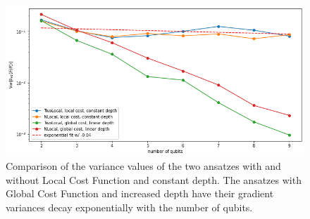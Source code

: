 \begin{figure}
    \includegraphics[width=\textwidth]{Artefact/Appendices/variancesLCF.png}
    \caption{
        Comparison of the variance values of the two ansatzes with and without Local Cost Function and constant depth.
        The ansatzes with Global Cost Function and increased depth have their gradient variances decay exponentially with the number of qubits. 
    }
    \label{Variance Local Cost}
\end{figure}
